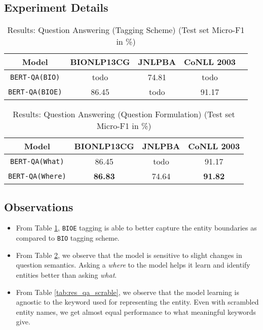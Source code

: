 \subsection{Experiment Details}


\begin{table}[h!]
\centering
\begin{tabular}{|c|c|c|c|c|}\hline
	\textbf{Model} & \textbf{BIONLP13CG} & \textbf{JNLPBA} & \textbf{CoNLL 2003}\\\hline
	\texttt{BERT-QA(BIO)} & todo & 74.81 & todo\\\hline
	\texttt{BERT-QA(BIOE)} & 86.45 & todo & 91.17\\\hline
	\end{tabular}
    \caption{Results: Question Answering (Tagging Scheme) (Test set Micro-F1 in \%)}
    \label{tab:res_qa_tagging}
\end{table}

\begin{table}[h!]
\centering
\begin{tabular}{|c|c|c|c|}\hline
	\textbf{Model} & \textbf{BIONLP13CG} & \textbf{JNLPBA} & \textbf{CoNLL 2003}\\\hline
	\texttt{BERT-QA(What)} & 86.45 & todo & 91.17\\\hline
	\texttt{BERT-QA(Where)} & \textbf{86.83} & 74.64 & \textbf{91.82}\\\hline
	\end{tabular}
    \caption{Results: Question Answering (Question Formulation) (Test set Micro-F1 in \%)}
    \label{tab:res_qa_question}
\end{table}

\subsection{Observations}
\begin{itemize}
    \item From Table \ref{tab:res_qa_tagging}, \texttt{BIOE} tagging is able to better capture the entity boundaries as compared to \texttt{BIO} tagging scheme.
    
    \item From Table \ref{tab:res_qa_question}, we observe that the model is sensitive to slight changes in question semantics. Asking a \textit{where} to the model helps it learn and identify entities better than asking \textit{what}. 
    
    \item From Table \ref{tab:res_qa_scrable}, we observe that the model learning is agnostic to the keyword used for representing the entity. Even with scrambled entity names, we get almost equal performance to what meaningful keywords give.
\end{itemize}

